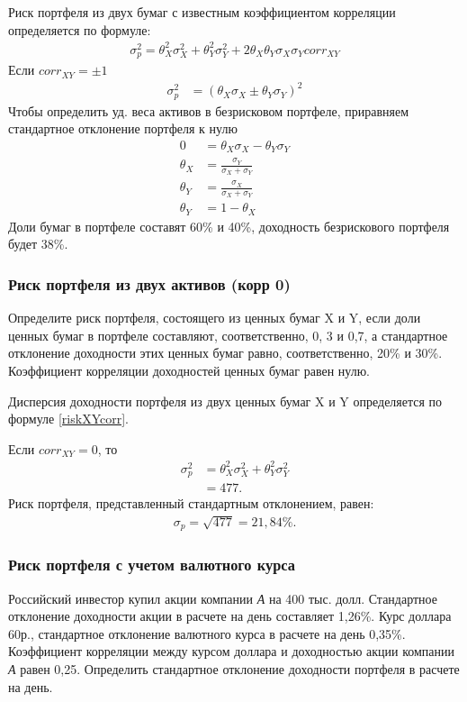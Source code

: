 \documentclass[12pt, table, a4paper,twoside]{exam}
\begin{document}
\begin{questions}
\begin{solution}[12em]
\raggedright
Риск портфеля из двух бумаг с известным коэффициентом корреляции определяется по формуле:
\begin{align}
\label{riskXYcorr}
\sigma_p^2=\theta_X^2\sigma_X^2+\theta_Y^2\sigma_Y^2+2\theta_X\theta_Y\sigma_X\sigma_Y corr_{XY}
\end{align}
Если $corr_{XY}=\pm 1$
\begin{align}
\sigma_p^2&=(\theta_X\sigma_X\pm\theta_Y\sigma_Y)^2
\end{align}
Чтобы определить уд. веса активов в безрисковом портфеле, приравняем стандартное отклонение портфеля к нулю
\begin{align*}
0&=\theta_X\sigma_X-\theta_Y\sigma_Y\\
\theta_X&=\frac{\sigma_Y}{\sigma_X+\sigma_Y}\\
\theta_Y&=\frac{\sigma_X}{\sigma_X+\sigma_Y}\\
\theta_Y&=1-\theta_X
\end{align*}
Доли бумаг в портфеле составят 60\% и 40\%, доходность безрискового портфеля будет 38\%.
\end{solution}

\subsubsection{Риск портфеля из двух активов (корр 0)}
\question[10] Определите риск портфеля, состоящего из ценных бумаг X и Y, если доли ценных бумаг в портфеле составляют, соответственно, 0, 3 и 0,7, а стандартное отклонение доходности этих ценных бумаг равно, соответственно, 20\% и 30\%. Коэффициент корреляции доходностей ценных бумаг равен нулю.

\begin{solution}[12em]
	
	\raggedright
	Дисперсия доходности портфеля из двух ценных бумаг X и Y определяется по формуле \ref{riskXYcorr}.
	
	Если $corr_{XY} = 0$, то
	\begin{align}
	\sigma_p^2&=\theta_X^2\sigma_X^2+\theta_Y^2\sigma_Y^2\\
	&=477.\nonumber
	\end{align}
	Риск портфеля, представленный стандартным отклонением, равен:
	\begin{align*}
	\sigma_p=\sqrt{477}=21,84\%.
	\end{align*}

\end{solution}


\subsubsection{Риск портфеля с учетом валютного курса}
\question[10] Российский инвестор купил акции компании \textit{А} на 400 тыс. долл. Стандартное отклонение доходности акции в расчете на день составляет 1,26\%. Курс доллара 60р., стандартное отклонение валютного курса в расчете на день 0,35\%. Коэффициент корреляции между курсом доллара и доходностью акции компании \textit{А} равен 0,25. Определить стандартное отклонение доходности портфеля в расчете на день.


\end{questions}
\end{document}
